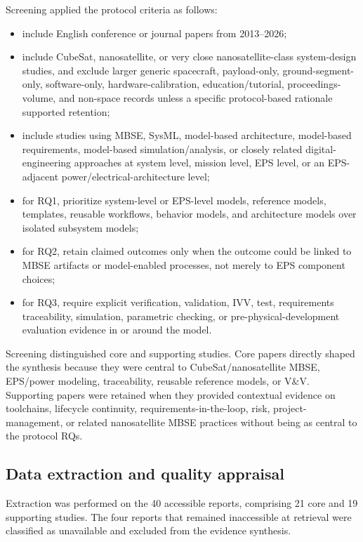 Screening applied the protocol criteria as follows:
\begin{itemize}
\item include English conference or journal papers from 2013--2026;
\item include CubeSat, nanosatellite, or very close nanosatellite-class system-design studies, and exclude larger generic spacecraft, payload-only, ground-segment-only, software-only, hardware-calibration, education/tutorial, proceedings-volume, and non-space records unless a specific protocol-based rationale supported retention;
\item include studies using MBSE, SysML, model-based architecture, model-based requirements, model-based simulation/analysis, or closely related digital-engineering approaches at system level, mission level, EPS level, or an EPS-adjacent power/electrical-architecture level;
\item for RQ1, prioritize system-level or EPS-level models, reference models, templates, reusable workflows, behavior models, and architecture models over isolated subsystem models;
\item for RQ2, retain claimed outcomes only when the outcome could be linked to MBSE artifacts or model-enabled processes, not merely to EPS component choices;
\item for RQ3, require explicit verification, validation, IVV, test, requirements traceability, simulation, parametric checking, or pre-physical-development evaluation evidence in or around the model.
\end{itemize}

Screening distinguished core and supporting studies.  Core papers directly shaped the synthesis because they were central to CubeSat/nanosatellite MBSE, EPS/power modeling, traceability, reusable reference models, or V\&V.  Supporting papers were retained when they provided contextual evidence on toolchains, lifecycle continuity, requirements-in-the-loop, risk, project-management, or related nanosatellite MBSE practices without being as central to the protocol RQs.

\subsection{Data extraction and quality appraisal}
Extraction was performed on the 40 accessible reports, comprising 21 core and 19 supporting studies.  The four reports that remained inaccessible at retrieval were classified as unavailable and excluded from the evidence synthesis.

